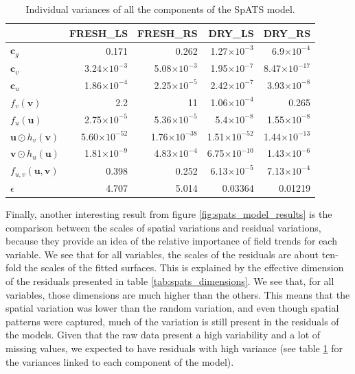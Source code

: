 \begin{table}[ht]
\centering
{}
\caption{Individual variances of all the components of the SpATS model.} 
\begin{tabular}{lrrrr}
  \toprule
 & FRESH\_LS & FRESH\_RS & DRY\_LS & DRY\_RS \\ 
  \midrule
$\mathbf{c}_{g}$ & 0.171 & 0.262 & 1.27$\times 10^{-3}$ & 6.9$\times 10^{-4}$ \\ 
  $\mathbf{c}_{v}$ & 3.24$\times 10^{-3}$ & 5.08$\times 10^{-3}$ & 1.95$\times 10^{-7}$ & 8.47$\times 10^{-17}$ \\ 
  $\mathbf{c}_{u}$ & 1.86$\times 10^{-4}$ & 2.25$\times 10^{-5}$ & 2.42$\times 10^{-7}$ & 3.93$\times 10^{-8}$ \\ 
  $f_{v}(\mathbf{v})$ & 2.2 & 11 & 1.06$\times 10^{-4}$ & 0.265 \\ 
  $f_{u}(\mathbf{u})$ & 2.75$\times 10^{-5}$ & 5.36$\times 10^{-5}$ & 5.4$\times 10^{-8}$ & 1.55$\times 10^{-8}$ \\ 
  $\boldsymbol{u} \odot h_{v}(\boldsymbol{v})$ & 5.60$\times 10^{-52}$ & 1.76$\times 10^{-38}$ & 1.51$\times 10^{-52}$ & 1.44$\times 10^{-13}$ \\ 
  $\boldsymbol{v} \odot h_{u}(\boldsymbol{u})$ & 1.81$\times 10^{-9}$ & 4.83$\times 10^{-4}$ & 6.75$\times 10^{-10}$ & 1.43$\times 10^{-6}$ \\ 
  $f_{u, v}(\boldsymbol{u}, \boldsymbol{v})$ & 0.398 & 0.252 & 6.13$\times 10^{-5}$ & 7.13$\times 10^{-4}$ \\ 
  $\epsilon$ & 4.707 & 5.014 & 0.03364 & 0.01219\\
   \bottomrule
\end{tabular}
\label{tab:spats_variances}
\end{table}

Finally, another interesting result from figure \ref{fig:spats_model_results} is the comparison between the scales of spatial variations and residual variations, because they provide an idea of the relative importance of field trends for each variable. We see that for all variables, the scales of the residuals are about ten-fold the scales of the fitted surfaces. This is explained by the effective dimension of the residuals presented in table \ref{tab:spats_dimensions}. We see that, for all variables, those dimensions are much higher than the others. This means that the spatial variation was lower than the random variation, and even though spatial patterns were captured, much of the variation is still present in the residuals of the models. Given that the raw data present a high variability and a lot of missing values, we expected to have residuals with high variance (see table \ref{tab:spats_variances} for the variances linked to each component of the model).

